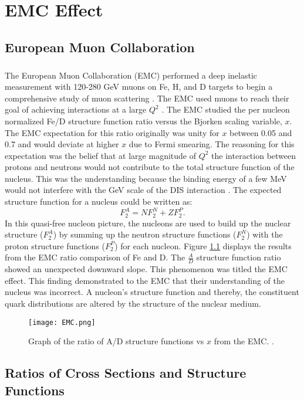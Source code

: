 \chapter{EMC Effect}	
\section{European Muon Collaboration}\label{sec:EMC}
\paragraph{}The European Muon Collaboration (EMC) performed a deep inelastic measurement with 120-280 GeV muons on Fe, H, and D targets to begin a comprehensive study of muon scattering \cite{challenge, Norton}. The EMC used muons to reach their goal of achieving interactions at a large $Q^2$ \cite{seelyth}. The EMC studied the per nucleon normalized Fe/D structure function ratio versus the Bjorken scaling variable, $x$. The EMC expectation for this ratio originally was unity for $x$ between 0.05 and 0.7 and would deviate at higher $x$ due to Fermi smearing\cite{CC}. The reasoning for this expectation was the belief that at large magnitude of $Q^2$ the interaction between protons and neutrons would not contribute to the total structure function of the nucleus. This was the understanding because the binding energy of a few MeV would not interfere with the GeV scale of the DIS interaction \cite{Ajth}. The expected structure function for a nucleus could be written as:
\begin{equation}
F_2^A = N F_2^N + ZF_2^P.
\end{equation}
In this quasi-free nucleon picture, the nucleons are used to build up the nuclear structure ($F_2^A$) by summing up the neutron structure functions ($F_2^N$) with the proton structure functions ($F_2^P$) for each nucleon. Figure \ref{EMCOld} displays the results from the EMC ratio comparison of Fe and D. The $\frac{A}{D}$ structure function ratio showed an unexpected downward slope. This phenomenon was titled the EMC effect. This finding demonstrated to the EMC that their understanding of the nucleus was incorrect. A nucleon's structure function and thereby, the constituent quark distributions are altered by the structure of the nuclear medium. 
\begin{figure}[t]
	\centering
	\texttt{[image: EMC.png]} 
	\caption{ Graph of the ratio of A/D structure functions vs $x$ from the EMC. \cite{CC,EM}.}
	\label{EMCOld}
\end{figure} 
\section{Ratios of Cross Sections and Structure Functions}
